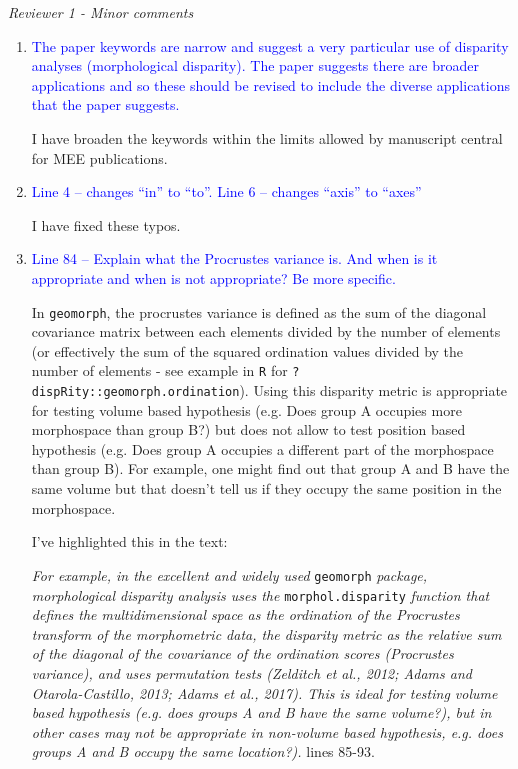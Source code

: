 \documentclass[12pt,letterpaper]{article}
\renewcommand{\subsection}[1]{%
\bigskip
\begin{center}
\begin{large}
\normalfont\itshape #1
\end{large}
\end{center}}
\begin{document}
\subsection{Reviewer 1 - Minor comments}

\begin{enumerate}

\item{\textcolor{blue}{The paper keywords are narrow and suggest a very particular use of disparity analyses (morphological disparity). The paper suggests there are broader applications and so these should be revised to include the diverse applications that the paper suggests. }}

I have broaden the keywords within the limits allowed by manuscript central for MEE publications. 

\item{\textcolor{blue}{Line 4 – changes ``in'' to ``to''. Line 6 – changes ``axis'' to ``axes''}}
\label{abstract_typo}

I have fixed these typos.

\item{\textcolor{blue}{Line 84 – Explain what the Procrustes variance is. And when is it appropriate and when is not appropriate? Be more specific.}}
\label{tone_down}

In \texttt{geomorph}, the procrustes variance is defined as the sum of the diagonal covariance matrix between each elements divided by the number of elements (or effectively the sum of the squared ordination values divided by the number of elements - see example in \texttt{R} for \texttt{?dispRity::geomorph.ordination}).
Using this disparity metric is appropriate for testing volume based hypothesis (e.g. Does group A occupies more morphospace than group B?) but does not allow to test position based hypothesis (e.g. Does group A occupies a different part of the morphospace than group B).
For example, one might find out that group A and B have the same volume but that doesn't tell us if they occupy the same position in the morphospace.

I've highlighted this in the text:

\textit{For example, in the excellent and widely used} \texttt{geomorph} \textit{package, morphological disparity analysis uses the} \texttt{morphol.disparity} \textit{function that defines the multidimensional space as the ordination of the Procrustes transform of the morphometric data, the disparity metric as the relative sum of the diagonal of the covariance of the ordination scores (Procrustes variance), and uses permutation tests (Zelditch et al., 2012; Adams and Otarola-Castillo, 2013; Adams et al., 2017). This is ideal for testing volume based hypothesis (e.g. does groups A and B have the same volume?), but in other cases may not be appropriate in non-volume based hypothesis, e.g. does groups A and B occupy the same location?).} lines 85-93.


\end{enumerate}
\end{document}

